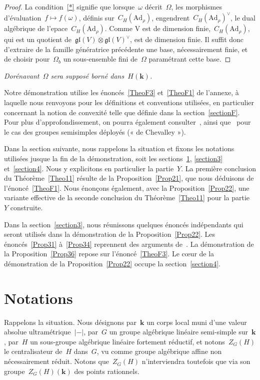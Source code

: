 \documentclass[french]{amsart}
\newcommand{\kk}{\mathbf{k}}
\newcommand{\abs}[1]{{\left|{#1}\right|}}
\newcommand{\Ad}{\mathrm{Ad}}
\newcommand{\lie}[1]{{\mathfrak{#1}}}
\newcommand{\gl}{\lie{gl}}
\begin{document}
\begin{proof}
La condition~\eqref{*} signifie que lorsque~$\omega$ décrit~$\Omega$, les morphismes d'é\-va\-lu\-a\-tion~$f \mapsto f (\omega)$, définis sur~$C_H(\Ad_\rho)$, engendrent~$C_H(\Ad_\rho)^\vee$, le dual algébrique de l’epace~$C_H(\Ad_\rho)$. 
Comme V est de dimension finie,~$C_H(\Ad_\rho)$, qui
est un quotient de~$\gl(V ) \otimes \gl(V )^\vee$, est de dimension finie.
Il suffit donc d'extraire
de la famille génératrice précédente une base, nécessairement finie, et de choisir pour~$\Omega_b$ un sous-ensemble fini de~$\Omega$ paramétrant cette base.
\end{proof}

\emph{Dorénavant~$\Omega$ sera supposé borné dans~$H(\kk)$.}

Notre démonstration utilise les énoncés~\ref{TheoF3} et~\ref{TheoF1} de l'annexe, à laquelle nous renvoyons pour les définitions et conventions utilisées, en particulier concernant la notion de convexité telle que définie dans la section~\ref{sectionF}. Pour plus d'approfondissement,
on pourra également consulter~\cite{RTW09}, ainsi que~\cite[chapitre 5]{Ber90} pour le cas des groupes semisimples déployés (« de Chevalley »).

Dans la section suivante, nous rappelons la situation et fixons les notations
utilisées jusque la fin de la démonstration, soit les sections~\ref{section2}, \ref{section3} et~\ref{section4}. Nous y explicitons en particulier la
partie~$Y $. La première conclusion du Théorème~\ref{Theo11} résulte de la Proposition~\ref{Prop21},
que nous déduisons de l'énoncé~\ref{TheoF1}. Nous énonçons également, avec la Proposition~\ref{Prop22}, une variante effective de la seconde conclusion du Théorème~\ref{Theo11} pour la
partie~$Y$ construite. 

Dans la section~\ref{section3}, nous réunissons quelques énoncés indépendants qui seront
utilisés dans la démonstration de la Proposition~\ref{Prop22}. Les énoncés~\ref{Prop31} à~\ref{Prop34} reprennent des arguments de~\cite{RS09}. La démonstration de la Proposition~\ref{Prop36}
repose sur l'énoncé~\ref{TheoF3}. Le cœur de la démonstration de la
Proposition~\ref{Prop22} occupe la section~\ref{section4}.

\section{Notations}\label{section2}

Rappelons la situation. Nous désignons par~$\kk$ un corps local muni d'une valeur
absolue ultramétrique~$\abs{-}$, par~$G$ un groupe algébrique linéaire semi-simple sur~$\kk$,
par~$H$ un sous-groupe algébrique linéaire fortement réductif, et notons~$Z_G(H)$ le centralisateur de~$H$ dans~$G$, vu
comme groupe algébrique affine non nécessairement réduit. Notons que~$Z_G (H)$ n'interviendra toutefois que via son groupe~$Z_G (H)(\kk)$ des points rationnels.
\end{document}
